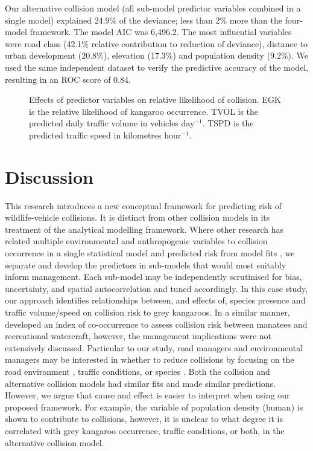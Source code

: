 Our alternative collision model (all sub-model predictor variables combined in a single model) explained 24.9\% of the deviance; less than 2\% more than the four-model framework.  The model AIC was 6,496.2. The most influential variables were road class (42.1\% relative contribution to reduction of deviance), distance to urban development (20.8\%), elevation (17.3\%) and population density (9.2\%). We used the same independent dataset to verify the predictive accuracy of the model, resulting in an ROC score of 0.84.

\begin{figure*}[!h]
  \centering
  \caption[Effects of predictor variables on relative likelihood of collision]{Effects of predictor variables on relative likelihood of collision. EGK is the relative likelihood of kangaroo occurrence. TVOL is the predicted daily traffic volume in vehicles day$^{-1}$. TSPD is the predicted traffic speed in kilometres hour$^{-1}$.}
  \label{egk_effects}
\end{figure*}

\section{Discussion}

This research introduces a new conceptual framework for predicting risk of wildlife-vehicle collisions. It is distinct from other collision models in its treatment of the analytical modelling framework. Where other research has related multiple environmental and anthropogenic variables to collision occurrence in a single statistical model \citep[e.g.][]{lee04,ramp05,kloc06,litv08,guns09,roge09} and predicted risk from model fits \citep[e.g.][]{malo04,sudh09,guns12}, we separate and develop the predictors in sub-models that would most suitably inform management. Each sub-model may be independently scrutinised for bias, uncertainty, and spatial autocorrelation and tuned accordingly. In this case study, our approach identifies relationships between, and effects of, species presence and traffic volume/speed on collision risk to grey kangaroos. In a similar manner, \cite{baud13} developed an index of co-occurrence to assess collision risk between manatees and recreational watercraft, however, the management implications were not extensively discussed. Particular to our study, road managers and environmental managers may be interested in whether to reduce collisions by focusing on the road environment \citep[e.g.][]{clev02,jaeg04,bond08,bond13}, traffic conditions, or species \citep[e.g.][]{huij03,huij06}. Both the collision and alternative collision models had similar fits and made similar predictions. However, we argue that cause and effect is easier to interpret when using our proposed framework. For example, the variable of population density (human) is shown to contribute to collisions, however, it is unclear to what degree it is correlated with grey kangaroo occurrence, traffic conditions, or both, in the alternative collision model.

